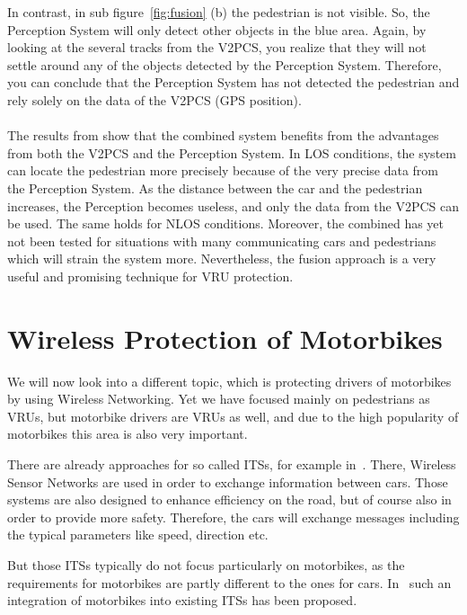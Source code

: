 \documentclass[]{ccs-thesis}
\begin{document}
In contrast, in sub figure~\ref{fig:fusion} (b) the pedestrian is not visible. So, the Perception System will only detect other objects in the blue area. Again, by looking at the several tracks from the \ac{V2PCS}, you realize that they will not settle around any of the objects detected by the Perception System. Therefore, you can conclude that the Perception System has not detected the pedestrian and rely solely on the data of the \ac{V2PCS} (GPS position).
\\\\
The results from \cite{2016fusion} show that the combined system benefits from the advantages from both the \ac{V2PCS} and the Perception System. In \ac{LOS} conditions, the system can locate the pedestrian more precisely because of the very precise data from the Perception System. As the distance between the car and the pedestrian increases, the Perception becomes useless, and only the data from the \ac{V2PCS} can be used. The same holds for \ac{NLOS} conditions. Moreover, the combined has yet not been tested for situations with many communicating cars and pedestrians which will strain the system more. Nevertheless, the fusion approach is a very useful and promising technique for \ac{VRU} protection.

\section{Wireless Protection of Motorbikes}\label{sec:motorbikes}

We will now look into a different topic, which is protecting drivers of motorbikes by using Wireless Networking. Yet we have focused mainly on pedestrians as \acp{VRU}, but motorbike drivers are \acp{VRU} as well, and due to the high popularity of motorbikes this area is also very important. 

There are already approaches for so called \acp{ITS}, for example in~\cite{its}. There, Wireless Sensor Networks are used in order to exchange information between cars.  Those systems are also designed to enhance efficiency on the road, but of course also in order to provide more safety. Therefore, the cars will exchange messages including the typical parameters like speed, direction etc.

But those \acp{ITS} typically do not focus particularly on motorbikes, as the requirements for motorbikes are partly different to the ones for cars. In~\cite{bikes} such an integration of motorbikes into existing \acp{ITS} has been proposed.
\end{document}
